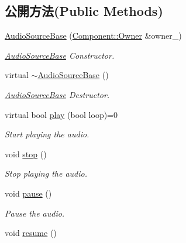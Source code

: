 \subsection*{公開方法(Public Methods)}
\begin{DoxyCompactItemize}
\item 
\hyperlink{class_i_dream_sky_1_1_audio_source_base_a8accbc06cfd3fcfc040d43c65ebf5b88}{Audio\+Source\+Base} (\hyperlink{class_i_dream_sky_1_1_component_1_1_owner}{Component\+::\+Owner} \&owner\+\_\+)
\begin{DoxyCompactList}\small\item\em \hyperlink{class_i_dream_sky_1_1_audio_source_base}{Audio\+Source\+Base} Constructor. \end{DoxyCompactList}\item 
virtual \hyperlink{class_i_dream_sky_1_1_audio_source_base_aebd15e698595d7592b9affe4cfbe747a}{$\sim$\+Audio\+Source\+Base} ()
\begin{DoxyCompactList}\small\item\em \hyperlink{class_i_dream_sky_1_1_audio_source_base}{Audio\+Source\+Base} Destructor. \end{DoxyCompactList}\item 
virtual bool \hyperlink{class_i_dream_sky_1_1_audio_source_base_a29610bbadb5aa3620b810067c0f9983d}{play} (bool loop)=0
\begin{DoxyCompactList}\small\item\em Start playing the audio. \end{DoxyCompactList}\item 
void \hyperlink{class_i_dream_sky_1_1_audio_source_base_a67549138116b6c4d7824fa38c8a856e2}{stop} ()\hypertarget{class_i_dream_sky_1_1_audio_source_base_a67549138116b6c4d7824fa38c8a856e2}{}\label{class_i_dream_sky_1_1_audio_source_base_a67549138116b6c4d7824fa38c8a856e2}

\begin{DoxyCompactList}\small\item\em Stop playing the audio. \end{DoxyCompactList}\item 
void \hyperlink{class_i_dream_sky_1_1_audio_source_base_ade617910f4a1eb964516aa68c705f471}{pause} ()\hypertarget{class_i_dream_sky_1_1_audio_source_base_ade617910f4a1eb964516aa68c705f471}{}\label{class_i_dream_sky_1_1_audio_source_base_ade617910f4a1eb964516aa68c705f471}

\begin{DoxyCompactList}\small\item\em Pause the audio. \end{DoxyCompactList}\item 
void \hyperlink{class_i_dream_sky_1_1_audio_source_base_aee8840f1895eb802d25cc6b494ce9891}{resume} ()\hypertarget{class_i_dream_sky_1_1_audio_source_base_aee8840f1895eb802d25cc6b494ce9891}{}\label{class_i_dream_sky_1_1_audio_source_base_aee8840f1895eb802d25cc6b494ce9891}


\end{DoxyCompactItemize}
